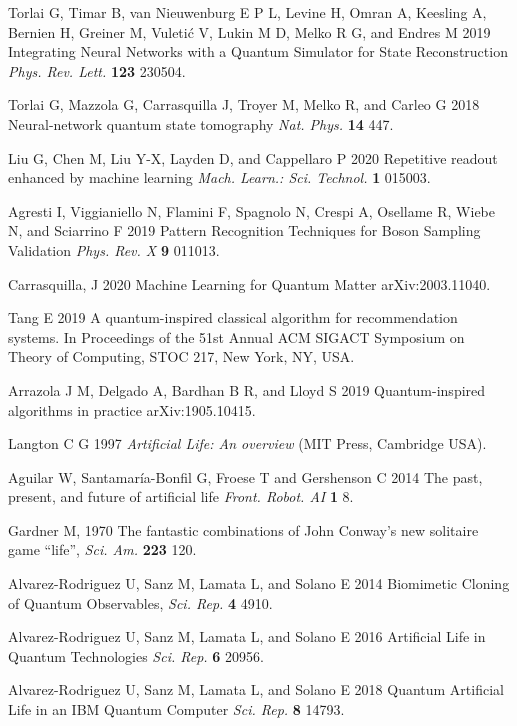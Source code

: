 \documentclass[12pt]{iopart}
\begin{document}
\begin{thebibliography}{999}
 Torlai G, Timar B, van Nieuwenburg E P L, Levine H, Omran A, Keesling A,  Bernien H, Greiner M, Vuleti\'{c} V, Lukin M D, Melko R G, and Endres M 2019 Integrating Neural Networks with a Quantum Simulator for State Reconstruction {\it Phys. Rev. Lett.} {\bf 123} 230504.

 Torlai G, Mazzola G, Carrasquilla J, Troyer M, Melko R, and Carleo G 2018 Neural-network quantum state tomography {\it Nat. Phys.} {\bf 14} 447.

 Liu G, Chen M, Liu Y-X, Layden D, and Cappellaro P 2020 Repetitive readout enhanced by machine learning {\it Mach. Learn.: Sci. Technol.} {\bf 1} 015003.

 Agresti I, Viggianiello N, Flamini F, Spagnolo N, Crespi A, Osellame R, Wiebe N, and Sciarrino F 2019 Pattern Recognition Techniques for Boson Sampling Validation {\it Phys. Rev. X} {\bf 9} 011013. 
 
 Carrasquilla, J 2020 Machine Learning for Quantum Matter arXiv:2003.11040.

 Tang E 2019 A quantum-inspired classical algorithm for recommendation systems. In Proceedings of the 51st Annual ACM SIGACT Symposium on Theory of Computing, STOC 217, New York, NY, USA.

  Arrazola J M, Delgado A, Bardhan B R, and Lloyd S 2019 Quantum-inspired algorithms in practice arXiv:1905.10415.

 Langton C G 1997 {\it Artificial Life: An overview} (MIT Press, Cambridge USA).

 Aguilar W, Santamar\'ia-Bonfil G, Froese T and Gershenson C 2014 The past, present, and future of artificial life {\it Front. Robot. AI} {\bf 1} 8.

 Gardner M, 1970 The fantastic combinations of John Conway's new solitaire game ``life'', {\it Sci. Am.} {\bf 223} 120.

 Alvarez-Rodriguez U, Sanz M, Lamata L, and Solano E 2014 Biomimetic Cloning of Quantum Observables, {\it Sci. Rep.} {\bf 4} 4910. 
 
 Alvarez-Rodriguez U, Sanz M, Lamata L, and Solano E 2016 Artificial Life in Quantum Technologies {\it Sci. Rep.} {\bf 6}  20956.

 Alvarez-Rodriguez U, Sanz M, Lamata L, and Solano E 2018 Quantum Artificial Life in an IBM Quantum Computer {\it Sci. Rep.} {\bf 8}  14793.


\end{thebibliography}
\end{document}
